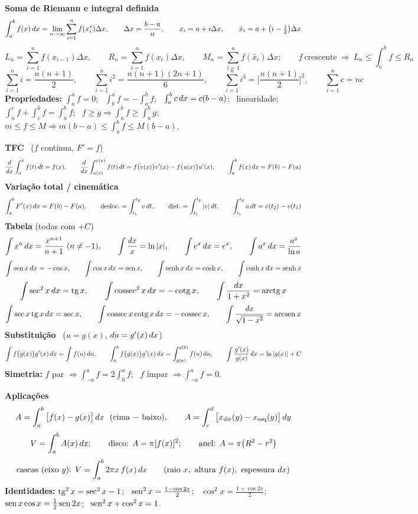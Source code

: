 \newpage
\begin{definicao}
\small
\textbf{Soma de Riemann e integral definida}
\[
\int_a^b f(x)\,dx=\lim_{n\to\infty}\sum_{i=1}^n f(x_i^*)\Delta x,\qquad \Delta x=\frac{b-a}{n},\qquad x_i=a+i\Delta x,\qquad \bar x_i=a+\big(i-\tfrac12\big)\Delta x
\]
\[
L_n=\sum_{i=1}^n f(x_{i-1})\Delta x,\qquad R_n=\sum_{i=1}^n f(x_i)\Delta x,\qquad M_n=\sum_{i=1}^n f(\bar x_i)\Delta x;\qquad f\ \text{crescente}\ \Rightarrow\ L_n\le\int_a^b f\le R_n
\]
\[
\sum_{i=1}^n i=\frac{n(n+1)}{2},\qquad \sum_{i=1}^n i^2=\frac{n(n+1)(2n+1)}{6},\qquad \sum_{i=1}^n i^3=\Big[\frac{n(n+1)}{2}\Big]^2,\qquad \sum_{i=1}^n c=nc
\]
\textbf{Propriedades:} $\int_a^a f=0$; \ $\int_b^a f=-\int_a^b f$; \ $\int_a^b c\,dx=c(b-a)$; \ linearidade; \ $\int_a^c f+\int_c^b f=\int_a^b f$; \ $f\ge g\Rightarrow\int_a^b f\ge\int_a^b g$; \ $m\le f\le M\Rightarrow m(b-a)\le\int_a^b f\le M(b-a)$.

\textbf{TFC} \ ($f$ contínua, $F'=f$)
\[
\frac{d}{dx}\int_a^x f(t)\,dt=f(x),\qquad
\frac{d}{dx}\int_{u(x)}^{v(x)}f(t)\,dt=f\big(v(x)\big)v'(x)-f\big(u(x)\big)u'(x),\qquad
\int_a^b f(x)\,dx=F(b)-F(a)
\]
\textbf{Variação total / cinemática}
\[
\int_a^b F'(x)\,dx=F(b)-F(a),\qquad
\text{desloc.}=\int_{t_1}^{t_2}v\,dt,\qquad
\text{dist.}=\int_{t_1}^{t_2}|v|\,dt,\qquad
\int_{t_1}^{t_2}a\,dt=v(t_2)-v(t_1)
\]
\textbf{Tabela} (todas com $+C$)
\[
\int x^n\dx=\frac{x^{n+1}}{n+1}\ (n\ne-1),\qquad
\int\frac{dx}{x}=\ln|x|,\qquad
\int e^x\dx=e^x,\qquad
\int a^x\dx=\frac{a^x}{\ln a}
\]
\[
\int\operatorname{sen} x\,dx=-\cos x,\qquad
\int\cos x\,dx=\operatorname{sen} x,\qquad
\int\operatorname{senh} x\,dx=\cosh x,\qquad
\int\cosh x\,dx=\operatorname{senh} x
\]
\[
\int\sec^2x\,dx=\operatorname{tg} x,\qquad
\int\operatorname{cossec}^2x\,dx=-\operatorname{cotg} x,\qquad
\int\frac{dx}{1+x^2}=\operatorname{arctg} x
\]
\[
\int\sec x\operatorname{tg} x\,dx=\sec x,\qquad
\int\operatorname{cossec} x\operatorname{cotg} x\,dx=-\operatorname{cossec} x,\qquad
\int\frac{dx}{\sqrt{1-x^2}}=\operatorname{arcsen} x
\]
\textbf{Substituição} \ ($u=g(x)$, $du=g'(x)\,dx$)
\[
\int f\big(g(x)\big)g'(x)\,dx=\int f(u)\,du,\qquad
\int_a^b f\big(g(x)\big)g'(x)\,dx=\int_{g(a)}^{g(b)}f(u)\,du,\qquad
\int\frac{g'(x)}{g(x)}\,dx=\ln|g(x)|+C
\]
\textbf{Simetria:} $f$ par $\Rightarrow\int_{-a}^a f=2\int_0^a f$; \ $f$ ímpar $\Rightarrow\int_{-a}^a f=0$.

\textbf{Aplicações}
\[
A=\int_a^b\big[f(x)-g(x)\big]\,dx\ \ \text{(cima $-$ baixo)},\qquad
A=\int_c^d\big[x_{\text{dir}}(y)-x_{\text{esq}}(y)\big]\,dy
\]
\[
V=\int_a^b A(x)\,dx;\qquad \text{disco: }A=\pi[f(x)]^2;\qquad \text{anel: }A=\pi\big(R^2-r^2\big)
\]
\[
\text{cascas (eixo $y$): }V=\int_a^b 2\pi x\,f(x)\,dx\qquad(\text{raio }x,\ \text{altura }f(x),\ \text{espessura }dx)
\]
\textbf{Identidades:} $\operatorname{tg}^2x=\sec^2x-1$; \ $\operatorname{sen}^2x=\frac{1-\cos2x}{2}$; \ $\cos^2x=\frac{1+\cos2x}{2}$; \ $\operatorname{sen} x\cos x=\frac12\operatorname{sen}2x$; \ $\operatorname{sen}^2x+\cos^2x=1$.
\end{definicao}
